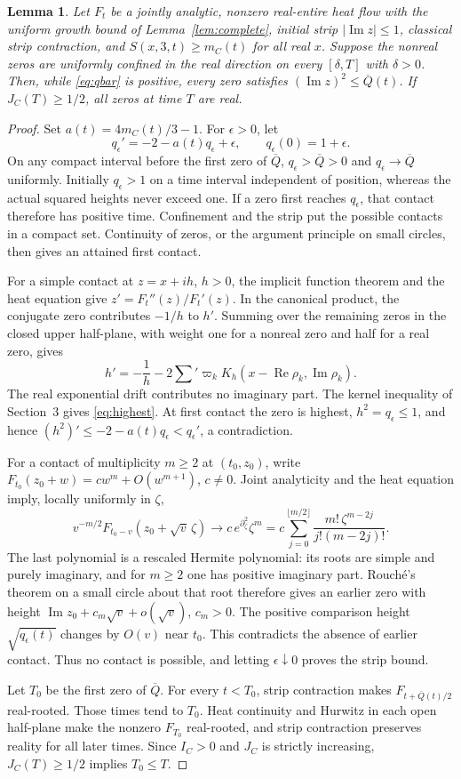 \documentclass[11pt]{article}
\newtheorem{lemma}[theorem]{Lemma}
\theoremstyle{remark}\newtheorem{remark}[theorem]{Remark}
\newcommand{\Rea}{\operatorname{Re}}
\newcommand{\Ima}{\operatorname{Im}}
\begin{document}
\begin{lemma}\label{lem:compact}
Let $F_t$ be a jointly analytic, nonzero real-entire heat flow with
the uniform growth bound of Lemma~\ref{lem:complete}, initial strip
$|\Ima z|\le1$, classical strip contraction, and
$S(x,3,t)\ge m_C(t)$ for all real $x$. Suppose the nonreal zeros are
uniformly confined in the real direction on every $[\delta,T]$ with
$\delta>0$. Then, while \eqref{eq:qbar} is positive,
every zero satisfies $(\Ima z)^2\le\overline Q(t)$. If
$J_C(T)\ge1/2$, all zeros at time $T$ are real.
\end{lemma}
\begin{proof}
Set $a(t)=4m_C(t)/3-1$. For $\epsilon>0$, let
\[
 q_\epsilon'=-2-a(t)q_\epsilon+\epsilon,
 \qquad q_\epsilon(0)=1+\epsilon.
\]
On any compact interval before the first zero of $\overline Q$,
$q_\epsilon>\overline Q>0$ and $q_\epsilon\to\overline Q$
uniformly. Initially $q_\epsilon>1$ on a time interval independent
of position, whereas the actual squared heights never exceed one.
If a zero first reaches $q_\epsilon$, that contact therefore has
positive time. Confinement and the strip put the possible contacts in
a compact set. Continuity of zeros, or the argument principle on small
circles, then gives an attained first contact.

For a simple contact at $z=x+ih$, $h>0$, the implicit function theorem
and the heat equation give $z'=F_t''(z)/F_t'(z)$. In the canonical
product, the conjugate zero contributes $-1/h$ to $h'$. Summing over
the remaining zeros in the closed upper half-plane, with weight one
for a nonreal zero and half for a real zero, gives
\[
 h'=-\frac1h-2\sum{}'\varpi_k K_h(x-\Rea\rho_k,\Ima\rho_k).
\]
The real exponential drift contributes no imaginary part. The kernel
inequality of Section~3 gives \eqref{eq:highest}. At first contact the
zero is highest, $h^2=q_\epsilon\le1$, and hence
$(h^2)'\le-2-a(t)q_\epsilon<q_\epsilon'$, a contradiction.

For a contact of multiplicity $m\ge2$ at $(t_0,z_0)$, write
$F_{t_0}(z_0+w)=c w^m+O(w^{m+1})$, $c\ne0$. Joint analyticity and
the heat equation imply, locally uniformly in $\zeta$,
\[
 v^{-m/2}F_{t_0-v}(z_0+\sqrt v\,\zeta)
 \longrightarrow c\,e^{\partial_\zeta^2}\zeta^m
 =c\sum_{j=0}^{\lfloor m/2\rfloor}
       \frac{m!\,\zeta^{m-2j}}{j!(m-2j)!}.
\]
The last polynomial is a rescaled Hermite polynomial: its roots are
simple and purely imaginary, and for $m\ge2$ one has positive
imaginary part. Rouch\'e's theorem on a small circle about that root
therefore gives an earlier zero with height
$\Ima z_0+c_m\sqrt v+o(\sqrt v)$, $c_m>0$. The positive comparison
height $\sqrt{q_\epsilon(t)}$ changes by $O(v)$ near $t_0$.
This contradicts the absence of earlier contact. Thus no contact is
possible, and letting $\epsilon\downarrow0$ proves the strip bound.

Let $T_0$ be the first zero of $\overline Q$. For every $t<T_0$,
strip contraction makes $F_{t+\overline Q(t)/2}$ real-rooted.
Those times tend to $T_0$. Heat continuity and Hurwitz in each open
half-plane make the nonzero $F_{T_0}$ real-rooted, and strip contraction
preserves reality for all later times. Since $I_C>0$ and $J_C$ is
strictly increasing, $J_C(T)\ge1/2$ implies $T_0\le T$.
\end{proof}
\end{document}
